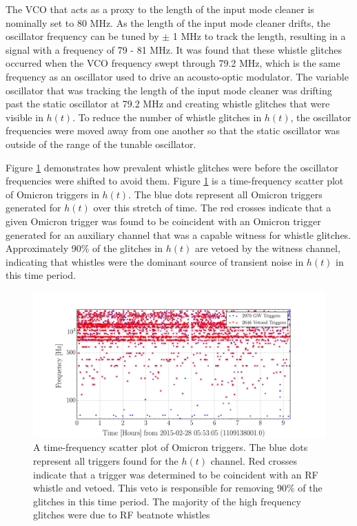 The VCO that acts as a proxy to the length of the input mode cleaner is 
nominally set to 80 MHz. As the length of the input mode cleaner drifts, the 
oscillator frequency can be tuned by $\pm$ 1 MHz to track the length, resulting 
in a signal with a frequency of 79 - 81 MHz. It was found that these whistle 
glitches occurred when the VCO frequency swept through 79.2 MHz, which is the 
same frequency as an oscillator used to drive an acousto-optic modulator. 
The variable oscillator that was tracking the length of the input mode cleaner 
was drifting past the static oscillator at 79.2 MHz and creating whistle glitches 
that were visible in $h(t)$.  
To reduce the number of whistle glitches in $h(t)$, the oscillator frequencies 
were moved away from one another so that the static oscillator was outside 
of the range of the tunable oscillator.

Figure \ref{fig:hveto-whistles} demonstrates how prevalent whistle glitches were 
before the oscillator frequencies were shifted to avoid them. Figure 
\ref{fig:hveto-whistles} is a time-frequency scatter plot of Omicron triggers in 
$h(t)$. The blue dots represent all Omicron triggers generated for $h(t)$ over 
this stretch of time. The red crosses indicate that a given Omicron trigger was found 
to be coincident with an Omicron trigger generated for an auxiliary channel that 
was a capable witness for whistle glitches. Approximately 90\% of the glitches in 
$h(t)$ are vetoed by the witness channel, indicating that whistles were the dominant 
source of transient noise in $h(t)$ in this time period. 


\begin{figure}[ht!]%
\includegraphics[width=\textwidth]{figures/detchar/Hveto_whistles_time_frequency}
\caption[Vetoed whistles from Hveto]{A time-frequency scatter plot of Omicron %
         triggers. The blue dots represent all triggers found for the $h(t)$ channel. %
         Red crosses indicate that a trigger was determined to be coincident with an %
         RF whistle and vetoed. This veto is responsible for removing 90\% of the %
         glitches in this time period. The majority of the high frequency glitches %
         were due to RF beatnote whistles}
\label{fig:hveto-whistles}
\end{figure}

